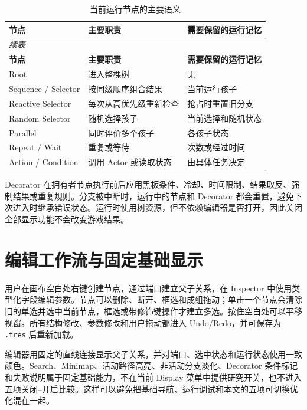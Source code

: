 \documentclass[11pt,a4paper,oneside,extrafontsizes]{memoir}
\begin{document}
\begin{center}
\small
\begin{longtable}{@{}p{} p{} p{}@{}}
\caption{当前运行节点的主要语义}\label{tab:auto-5}\\
\toprule
\textbf{节点} & \textbf{主要职责} & \textbf{需要保留的运行记忆} \\
\midrule
\endfirsthead
\multicolumn{3}{l}{\small\itshape 续表}\\
\toprule
\textbf{节点} & \textbf{主要职责} & \textbf{需要保留的运行记忆} \\
\midrule
\endhead
Root & 进入整棵树 & 无 \\
Sequence / Selector & 按同级顺序组合结果 & 当前运行孩子 \\
Reactive Selector & 每次从高优先级重新检查 & 抢占时重置旧分支 \\
Random Selector & 随机选择孩子 & 当前选择和随机状态 \\
Parallel & 同时评价多个孩子 & 各孩子状态 \\
Repeat / Wait & 重复或等待 & 次数或经过时间 \\
Action / Condition & 调用 Actor 或读取状态 & 由具体任务决定 \\
\bottomrule
\end{longtable}
\end{center}

Decorator 在拥有者节点执行前后应用黑板条件、冷却、时间限制、结果取反、强制结果或重复规则。分支被中断时，运行中的节点和 Decorator 都会重置，避免下次进入时继承错误状态。运行时使用树资源，但不依赖编辑器是否打开，因此关闭全部显示功能不会改变游戏结果。

\section{编辑工作流与固定基础显示}

用户在画布空白处右键创建节点，通过端口建立父子关系，在 Inspector 中使用类型化字段编辑参数。节点可以删除、断开、框选和成组拖动；单击一个节点会清除旧的单选并选中当前节点，框选或带修饰键操作才建立多选。按住空白处可以平移视窗。所有结构修改、参数修改和用户拖动都进入 Undo/Redo，并可保存为 \texttt{.tres} 后重新加载。

编辑器用固定的直线连接显示父子关系，并对端口、选中状态和运行状态使用一致颜色。Search、Minimap、活动路径高亮、非活动分支淡化、Decorator 条件标记和失败说明属于固定基础能力，不在当前 Display 菜单中提供研究开关，也不进入五项关闭–开启比较。这样可以避免把基础导航、运行调试和本文的五项可切换优化混在一起。
\end{document}
